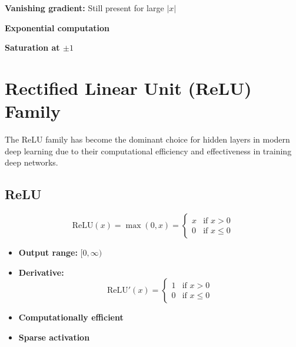 \begin{disadvantages}
    \item \textbf{Vanishing gradient:} Still present for large $|x|$
    \item \textbf{Exponential computation}
    \item \textbf{Saturation at $\pm 1$}
\end{disadvantages}

\section{Rectified Linear Unit (ReLU) Family}

The ReLU family has become the dominant choice for hidden layers in modern deep learning due to their computational efficiency and effectiveness in training deep networks.

\subsection{ReLU}

\begin{equation}
\text{ReLU}(x) = \max(0, x) = 
\begin{cases}
x & \text{if } x > 0 \\
0 & \text{if } x \leq 0
\end{cases}
\end{equation}

\begin{properties}
\begin{itemize}
    \item \textbf{Output range:} $[0, \infty)$
    \item \textbf{Derivative:} 
    \begin{equation}
    \text{ReLU}'(x) = 
    \begin{cases}
    1 & \text{if } x > 0 \\
    0 & \text{if } x \leq 0
    \end{cases}
    \end{equation}
    \item \textbf{Computationally efficient}
    \item \textbf{Sparse activation}
\end{itemize}
\end{properties}


